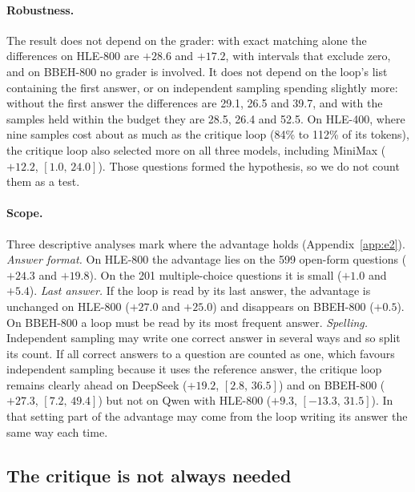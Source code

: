 \documentclass[11pt]{article}
\newcommand{\ds}{DeepSeek}
\newcommand{\qw}{Qwen}
\newcommand{\mm}{MiniMax}
\newcommand{\ci}[2]{$[#1,\,#2]$}
\begin{document}
\paragraph{Robustness.}
The result does not depend on the grader: with exact matching alone the differences on HLE-800 are $+28.6$ and $+17.2$, with intervals that exclude zero, and on BBEH-800 no grader is involved.
It does not depend on the loop's list containing the first answer, or on independent sampling spending slightly more: without the first answer the differences are 29.1, 26.5 and 39.7, and with the samples held within the budget they are 28.5, 26.4 and 52.5.
On HLE-400, where nine samples cost about as much as the critique loop (84\% to 112\% of its tokens), the critique loop also selected more on all three models, including \mm{} ($+12.2$, \ci{1.0}{24.0}). Those questions formed the hypothesis, so we do not count them as a test.

\paragraph{Scope.}
Three descriptive analyses mark where the advantage holds (Appendix~\ref{app:e2}).
\emph{Answer format.} On HLE-800 the advantage lies on the 599 open-form questions ($+24.3$ and $+19.8$). On the 201 multiple-choice questions it is small ($+1.0$ and $+5.4$).
\emph{Last answer.} If the loop is read by its last answer, the advantage is unchanged on HLE-800 ($+27.0$ and $+25.0$) and disappears on BBEH-800 ($+0.5$). On BBEH-800 a loop must be read by its most frequent answer.
\emph{Spelling.} Independent sampling may write one correct answer in several ways and so split its count. If all correct answers to a question are counted as one, which favours independent sampling because it uses the reference answer, the critique loop remains clearly ahead on \ds{} ($+19.2$, \ci{2.8}{36.5}) and on BBEH-800 ($+27.3$, \ci{7.2}{49.4}) but not on \qw{} with HLE-800 ($+9.3$, \ci{-13.3}{31.5}). In that setting part of the advantage may come from the loop writing its answer the same way each time.

\subsection{The critique is not always needed}
\label{sec:placebo}
\end{document}
